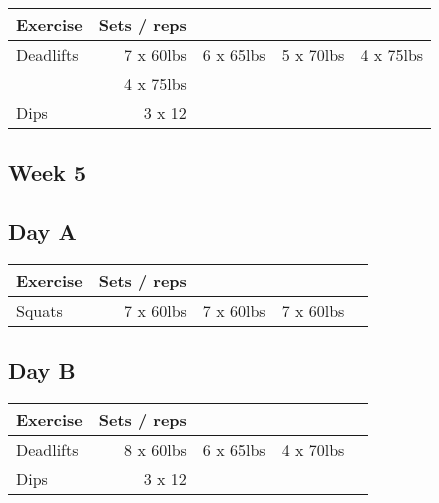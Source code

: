 \documentclass[12pt, a4paper]{article}%
\begin{document}
  \begin{tabular}{l|rrrr}
  \hspace{0.75em} \textbf{Exercise} & \textbf{Sets / reps} \\ \hline

            \hspace{0.75em} Deadlifts
            & 7 x 60lbs
            & 6 x 65lbs
            & 5 x 70lbs
            & 4 x 75lbs
            \\


            \hspace{0.75em}
            & 4 x 75lbs
            & 
            & 
            & 
            \\


   \hspace{0.75em} Dips & 3 x 12 \\
  \end{tabular}

 \subsection*{\hspace{0.25em} Week 5 }
  \subsection*{\hspace{0.5em} Day A }


  \begin{tabular}{l|rrrr}
  \hspace{0.75em} \textbf{Exercise} & \textbf{Sets / reps} \\ \hline

            \hspace{0.75em} Squats
            & 7 x 60lbs
            & 7 x 60lbs
            & 7 x 60lbs
            & 
            \\


  \end{tabular}

  \subsection*{\hspace{0.5em} Day B }


  \begin{tabular}{l|rrrr}
  \hspace{0.75em} \textbf{Exercise} & \textbf{Sets / reps} \\ \hline

            \hspace{0.75em} Deadlifts
            & 8 x 60lbs
            & 6 x 65lbs
            & 4 x 70lbs
            & 
            \\


   \hspace{0.75em} Dips & 3 x 12 \\
  \end{tabular}
\end{document}
